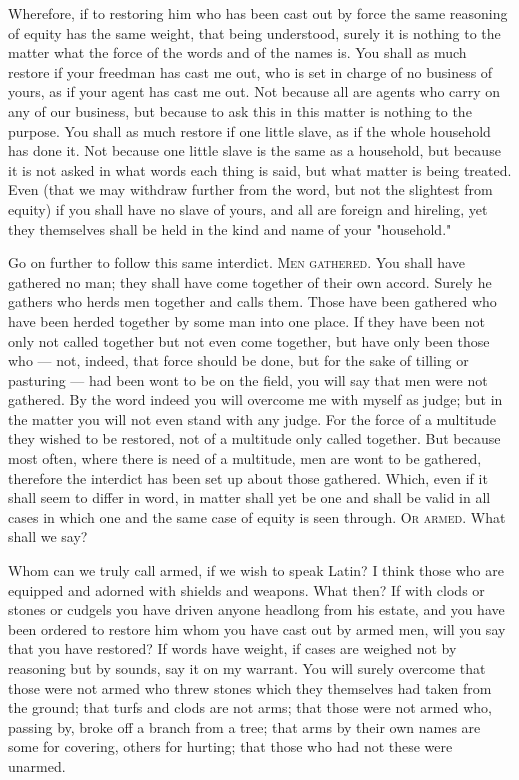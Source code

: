  Wherefore, if to restoring him who has been cast out by force the same reasoning of equity has the same weight, that being understood, surely it is nothing to the matter what the force of the words and of the names is. You shall as much restore if your freedman has cast me out, who is set in charge of no business of yours, as if your agent has cast me out. Not because all are agents who carry on any of our business, but because to ask this in this matter is nothing to the purpose. You shall as much restore if one little slave, as if the whole household has done it. Not because one little slave is the same as a household, but because it is not asked in what words each thing is said, but what matter is being treated. Even (that we may withdraw further from the word, but not the slightest from equity) if you shall have no slave of yours, and all are foreign and hireling, yet they themselves shall be held in the kind and name of your "household."

 Go on further to follow this same interdict. \textsc{Men gathered}. You shall have gathered no man; they shall have come together of their own accord. Surely he gathers who herds men together and calls them. Those have been gathered who have been herded together by some man into one place. If they have been not only not called together but not even come together, but have only been those who --- not, indeed, that force should be done, but for the sake of tilling or pasturing --- had been wont to be on the field, you will say that men were not gathered. By the word indeed you will overcome me with myself as judge; but in the matter you will not even stand with any judge. For the force of a multitude they wished to be restored, not of a multitude only called together. But because most often, where there is need of a multitude, men are wont to be gathered, therefore the interdict has been set up about those gathered. Which, even if it shall seem to differ in word, in matter shall yet be one and shall be valid in all cases in which one and the same case of equity is seen through. \textsc{Or armed}. What shall we say?

 Whom can we truly call armed, if we wish to speak Latin? I think those who are equipped and adorned with shields and weapons. What then? If with clods or stones or cudgels you have driven anyone headlong from his estate, and you have been ordered to restore him whom you have cast out by armed men, will you say that you have restored? If words have weight, if cases are weighed not by reasoning but by sounds, say it on my warrant. You will surely overcome that those were not armed who threw stones which they themselves had taken from the ground; that turfs and clods are not arms; that those were not armed who, passing by, broke off a branch from a tree; that arms by their own names are some for covering, others for hurting; that those who had not these were unarmed.

